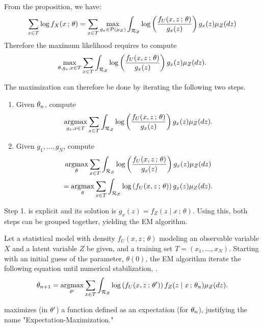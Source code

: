From the proposition, we have:
\[
\sum_{x\in T}\log f_X(x\,;\,\theta)= \sum_{x\in T} \max_{g_x\in {\mathcal P}(\mu_Z)} \int_{{\mathcal R}_Z} \log \left(\frac{f_U(x,
z\,;\,\theta)}{g_x(z)}\right) g_x(z) \mu_Z(dz)  
\]
Therefore the maximum likelihood requires to compute
\begin{equation}
\label{eq:lik.var}
\max_{\theta, g_x, x\in T} \sum_{x\in T} \int_{{\mathcal R}_Z} \log \left(\frac{f_U(x,
z\,;\,\theta)}{g_x(z)}\right) g_x(z) \mu_Z(dz)  .
\end{equation}

The maximization can therefore be done by iterating the following  two steps.
\begin{enumerate}[label=\arabic*., wide=0.5cm]
\item Given $\theta_n$,  compute 
\[
\operatorname*{argmax}_{g_x, x\in T} \sum_{x\in T} \int_{{\mathcal R}_Z} \log \left(\frac{f_U(x,
z\,;\,\theta)}{g_x(z)}\right) g_x(z) \mu_Z(dz) .
\]
\item Given $g_1, \ldots, g_N$,  compute 
\begin{multline*}
\operatorname*{argmax}_{\theta}  \sum_{x\in T} \int_{{\mathcal R}_Z} \log \left(\frac{f_U(x,
z\,;\,\theta)}{g_x(z)}\right) g_x(z) \mu_Z(dz) \\
=  \operatorname*{argmax}_{\theta} 
\sum_{x\in T} \int_{{\mathcal R}_Z} \log \left(f_U(x,
z\,;\,\theta)\right) g_x(z) \mu_Z(dz).
\end{multline*}
\end{enumerate}

Step 1. is explicit and its solution is $g_x(z) = f_Z(z\mid x\,;\,\theta)$. 
Using this, both steps can be grouped together, yielding the EM algorithm.
\begin{algorithm}[EM algorithm]
\label{alg:EM}
Let a statistical model with density $f_U(x,z\,;\,\theta)$ modeling an observable variable $X$ and a latent variable $Z$ be given, and a training set $T = (x_1, \ldots, x_N)$. Starting with an initial guess of the parameter, $\theta(0)$, the EM algorithm iterate the following equation until numerical stabilization, . 
\begin{equation}
\label{eq:EM}
\theta_{n+1} = \operatorname*{argmax}_{\theta'} \sum_{x\in T} \int_{{\mathcal R}_Z} \log \left(f_U(x,
z\,;\,\theta')\right) f_Z(z\mid x\,;\,\theta_n) \mu_Z(dz).
\end{equation}
\end{algorithm}
 maximizes (in $\theta'$) a function defined as an expectation (for $\theta_n$), justifying the name "Expectation-Maximization."

